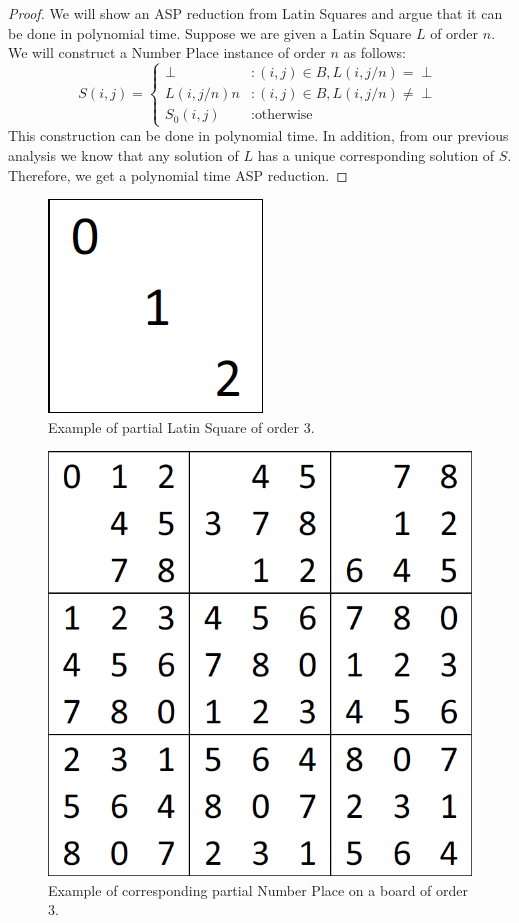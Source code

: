 \documentclass[runningheads,a4paper]{llncs}
\begin{document}
\begin{proof} We will show an ASP reduction from Latin Squares and argue that it can be done in polynomial time.
Suppose we are given a Latin Square $L$ of order $n$. We will construct a Number Place instance of order $n$ as follows:
\begin{displaymath}
S(i,j) = \left\{
\begin{array}{lr}
\perp & : (i,j) \in B, L(i, j/n) = \perp \\
L(i, j/n) n & : (i,j) \in B, L(i, j/n) \neq \perp \\
S_0 (i,j) & : \text{otherwise}
\end{array}
\right.
\end{displaymath}
This construction can be done in polynomial time. In addition, from our previous analysis we know that any solution of $L$ has a unique corresponding solution of $S$. Therefore, we get a polynomial time ASP reduction.
\end{proof}

\begin{figure}[H]
\label{fig:sudok}
\centering
\includegraphics[scale=0.25]{sudoku-3.png}
\caption{Example of partial Latin Square of order 3.}
\end{figure}

\begin{figure}[H]
\label{fig:partialNP}
\centering
\includegraphics[scale=0.25]{sudoku-1.png}
\caption{Example of corresponding partial Number Place on a board of order 3.}
\end{figure}



\end{document}
